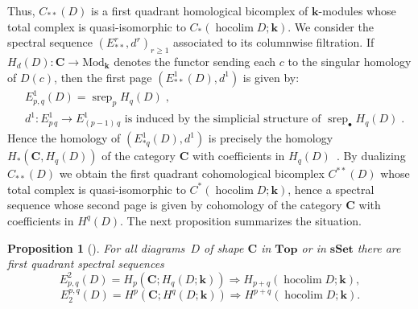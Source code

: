 \documentclass{amsart}
\newtheorem{proposition}[formula]{Proposition}
\theoremstyle{definition}
\theoremstyle{remark}
\DeclareMathOperator{\hoc}{hocolim}
\DeclareMathOperator{\srep}{srep}
\renewcommand{\ge}{\geqslant}
\newcommand{\Cc}{\mathbf{C}}
\newcommand{\sset}{\mathbf{sSet}}
\renewcommand{\top}{\mathbf{Top}}
\def\k{\mathbf{k}}
\begin{document}
Thus, $C_{**}(D)$ is a first quadrant homological bicomplex of $\k$-modules whose total complex is quasi-isomorphic to $C_*(\hoc D;\k)$. We consider the spectral sequence $(E_{**}^r,d^r)_{r\ge 1}$ associated to its columnwise filtration. 
If $H_d(D)\colon\Cc\to \mathrm{Mod}_\k$ denotes the functor sending each $c$ to the singular homology of $D(c)$, then the first page $(E^1_{**}(D), d^1)$ is given by:
\begin{align*}
	&E^1_{p,q}(D)= \srep_p H_q(D)\;,\\
	&d^1:E^1_{p\,q}\to E^1_{(p-1)\,q} \text{ is induced by the simplicial structure of $\srep_\bullet H_q(D)$}\;.
\end{align*}
Hence the homology of $(E^1_{*q}(D),d^1)$ is precisely the homology $H_*(\Cc,H_q(D))$ of the category $\Cc$ with coefficients in $H_q(D)$~\cite[Appendix~C.10]{lo-98}. By dualizing $C_{**}(D)$ we obtain the first quadrant cohomological bicomplex $C^{**}(D)$ whose total complex is quasi-isomorphic to $C^*( \hoc D; \k)$, hence a spectral sequence whose second page is given by cohomology of the category $\Cc$ with coefficients in $H^q(D)$. The next proposition summarizes the situation.

\begin{proposition}[{\cite[Theorem~18.3]{du}}]\label{pr:ss}
	For all diagrams~$D$ of shape $\Cc$ in $\top$ or in $\sset$ there are first quadrant spectral sequences
	\[
		E^{2}_{p,q}(D)=H_{p}(\Cc;H_{q}(D;\k))\Rightarrow H_{p+q}(\hoc D;\k),
	\]
	\[
		E_{2}^{p,q}(D)=H^{p}(\Cc;H^{q}(D;\k))\Rightarrow H^{p+q}(\hoc D;\k).
	\]    
\end{proposition}
\end{document}
